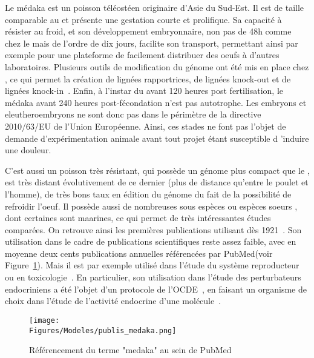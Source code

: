 \documentclass[\main/main.tex]{subfiles}
\begin{document}
%
Le médaka est un poisson téléostéen originaire d'Asie du Sud-Est.
%
Il est de taille comparable au \pz{} et présente une gestation courte et prolifique.
%
Sa capacité à résister au froid, et son développement embryonnaire, non pas de 48h comme chez le \pz{} mais de l'ordre de dix jours,  facilite son transport, permettant ainsi par exemple pour une plateforme de facilement distribuer des oeufs à d'autres laboratoires.
%
Plusieurs outils de modification du génome ont été mis en place chez \ol{}\cite{kirchmaier_2015, ansai_2017}, 
ce qui permet la création de lignées rapportrices, de lignées knock-out et de lignées knock-in~\cite{abdelmoneim_2018,jin_2020,Watakabe_2018,qiu_2014,gay_2018}.
%
Enfin, à l'instar du \pz{} avant 120 heures post fertilisation,
le médaka avant 240 heures post-fécondation n'est pas autotrophe.
%
Les embryons et eleutheroembryons ne sont donc pas dans le périmètre de la directive 2010/63/EU de l'Union Européenne.
%
Ainsi, ces stades ne font pas l'objet de demande d'expérimentation animale avant tout projet étant susceptible d 'induire une douleur.

%
C'est aussi un poisson très résistant, qui possède un génome plus compact que le \pz{} , est très distant évolutivement de ce dernier (plus de distance qu'entre le poulet et l'homme), de très bons taux en édition du génome du fait de la possibilité de refroidir l'oeuf. Il possède aussi de nombreuses sous espèces ou espèces soeurs , dont certaines sont maarines, ce qui permet de très intéressantes études comparées.
%
On retrouve ainsi les premières publications utilisant \ol{} dès 1921~\cite{aida_1921}.
%
Son utilisation dans le cadre de publications scientifiques reste assez faible, avec en moyenne deux cents publications annuelles référencées par PubMed(voir Figure~\ref{fig:model:oz:stats}).
%
Mais il est par exemple utilisé dans l'étude du système reproducteur~\cite{gay_2018,herberg_2018} ou
en toxicologie~\cite{carvan_2007,bertotto_2019,cleary_2019,powe_2018}.
%
En particulier, son utilisation dans l'étude des perturbateurs endocriniens a été l'objet d'un protocole de l'OCDE~\cite{oecd_2009}, en faisant un organisme de choix dans l'étude de l'activité endocrine d'une molécule~\cite{chen_2018,dang_2019,spirhanzlova_2016}.

\begin{figure}[htbp]{\textwidth} 
    \centering
       \centering \texttt{[image: \\Figures/Modeles/publis\_medaka.png]}
       \caption{
            \label{fig:model:oz:stats}Référencement du terme "medaka" au sein de PubMed
            }
\end{figure}
\end{document}
